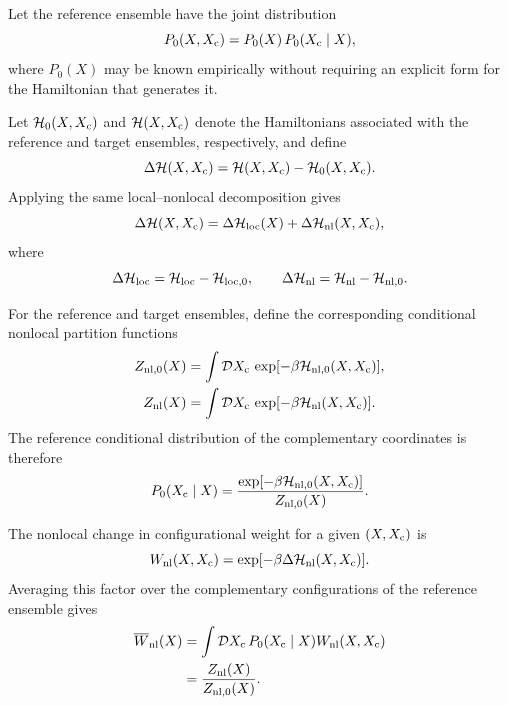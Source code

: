 \documentclass[11pt]{article}
\begin{document}
Let the reference ensemble have the joint distribution
\begin{equation}
P_0(X,X_{\rm c})
=
P_0(X)\,P_0(X_{\rm c}\mid X),
\end{equation}
where \(P_0(X)\) may be known empirically without requiring an explicit form for the Hamiltonian that generates it.

Let \(\mathcal H_0(X,X_{\rm c})\) and \(\mathcal H(X,X_{\rm c})\) denote the Hamiltonians associated with the reference and target ensembles, respectively, and define
\begin{equation}
\Delta\mathcal H(X,X_{\rm c})
=
\mathcal H(X,X_{\rm c})
-
\mathcal H_0(X,X_{\rm c}).
\end{equation}
Applying the same local--nonlocal decomposition gives
\begin{equation}
\Delta\mathcal H(X,X_{\rm c})
=
\Delta\mathcal H_{\rm loc}(X)
+
\Delta\mathcal H_{\rm nl}(X,X_{\rm c}),
\end{equation}
where
\begin{equation}
\Delta\mathcal H_{\rm loc}
=
\mathcal H_{\rm loc}
-
\mathcal H_{{\rm loc},0},
\qquad
\Delta\mathcal H_{\rm nl}
=
\mathcal H_{\rm nl}
-
\mathcal H_{{\rm nl},0}.
\label{eq:DeltaHnl}
\end{equation}

For the reference and target ensembles, define the corresponding conditional nonlocal partition functions
\begin{align}
Z_{{\rm nl},0}(X)
&=
\int\mathcal D X_{\rm c}\,
\exp[-\beta\mathcal H_{{\rm nl},0}(X,X_{\rm c})],
\\
Z_{\rm nl}(X)
&=
\int\mathcal D X_{\rm c}\,
\exp[-\beta\mathcal H_{\rm nl}(X,X_{\rm c})].
\end{align}
The reference conditional distribution of the complementary coordinates is therefore
\begin{equation}
P_0(X_{\rm c}\mid X)
=
\frac{
\exp[-\beta\mathcal H_{{\rm nl},0}(X,X_{\rm c})]
}{
Z_{{\rm nl},0}(X)
}.
\label{eq:P0_Xc_given_X}
\end{equation}

The nonlocal change in configurational weight for a given \((X,X_{\rm c})\) is
\begin{equation}
W_{\rm nl}(X,X_{\rm c})
=
\exp[-\beta\Delta\mathcal H_{\rm nl}(X,X_{\rm c})].
\label{eq:Wnl}
\end{equation}
Averaging this factor over the complementary configurations of the reference ensemble gives
\begin{align}
\overline W_{\rm nl}(X)
&=
\int\mathcal D X_{\rm c}\,
P_0(X_{\rm c}\mid X)
W_{\rm nl}(X,X_{\rm c})
\nonumber\\
&=
\frac{Z_{\rm nl}(X)}
{Z_{{\rm nl},0}(X)}.
\label{eq:Wnl_avg}
\end{align}
\end{document}
